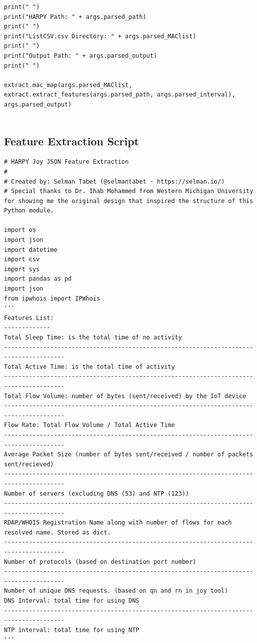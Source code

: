 \documentclass{article}
\begin{document}
\begin{appendices}
\begin{verbatim}
print(" ")
print("HARPY Path: " + args.parsed_path)
print(" ")
print("ListCSV.csv Directory: " + args.parsed_MAClist)
print(" ")
print("Output Path: " + args.parsed_output)
print(" ")

extract.mac_map(args.parsed_MAClist, extract.extract_features(args.parsed_path, args.parsed_interval), args.parsed_output)


\end{verbatim}

\subsection{Feature Extraction Script}
\begin{verbatim}
# HARPY Joy JSON Feature Extraction
#
# Created by: Selman Tabet (@selmantabet - https://selman.io/)
# Special thanks to Dr. Ihab Mohammed from Western Michigan University for showing me the original design that inspired the structure of this Python module.

import os
import json
import datetime
import csv
import sys
import pandas as pd
import json
from ipwhois import IPWhois
'''
Features List:
-------------
Total Sleep Time: is the total time of no activity
---------------------------------------------------------------------------------------
Total Active Time: is the total time of activity
---------------------------------------------------------------------------------------
Total Flow Volume: number of bytes (sent/received) by the IoT device
---------------------------------------------------------------------------------------
Flow Rate: Total Flow Volume / Total Active Time
---------------------------------------------------------------------------------------
Average Packet Size (number of bytes sent/received / number of packets sent/recieved)
---------------------------------------------------------------------------------------
Number of servers (excluding DNS (53) and NTP (123))
---------------------------------------------------------------------------------------
RDAP/WHOIS Registration Name along with number of flows for each resolved name. Stored as dict.
---------------------------------------------------------------------------------------
Number of protocols (based on destination port number)
---------------------------------------------------------------------------------------
Number of unique DNS requests. (based on qn and rn in joy tool)
DNS Interval: total time for using DNS
---------------------------------------------------------------------------------------
NTP interval: total time for using NTP
'''



\end{verbatim}
\end{appendices}
\end{document}
